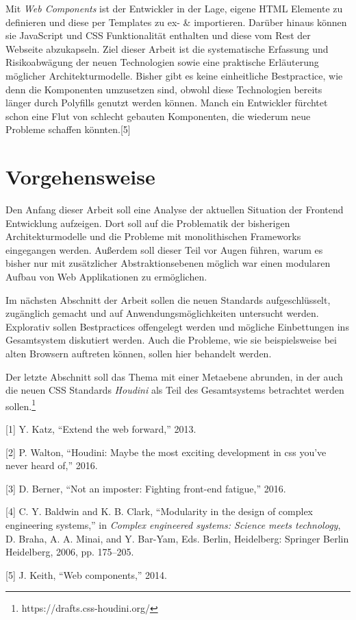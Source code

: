Mit \emph{Web Components} ist der Entwickler in der Lage, eigene HTML
Elemente zu definieren und diese per Templates zu ex- \& importieren.
Darüber hinaus können sie JavaScript und CSS Funktionalität enthalten
und diese vom Rest der Webseite abzukapseln. Ziel dieser Arbeit ist die
systematische Erfassung und Risikoabwägung der neuen Technologien sowie
eine praktische Erläuterung möglicher Architekturmodelle. Bisher gibt es
keine einheitliche Bestpractice, wie denn die Komponenten umzusetzen
sind, obwohl diese Technologien bereits länger durch Polyfills genutzt
werden können. Manch ein Entwickler fürchtet schon eine Flut von
schlecht gebauten Komponenten, die wiederum neue Probleme schaffen
könnten.{[}5{]}

\section{Vorgehensweise}\label{vorgehensweise}

Den Anfang dieser Arbeit soll eine Analyse der aktuellen Situation der
Frontend Entwicklung aufzeigen. Dort soll auf die Problematik der
bisherigen Architekturmodelle und die Probleme mit monolithischen
Frameworks eingegangen werden. Außerdem soll dieser Teil vor Augen
führen, warum es bisher nur mit zusätzlicher Abstraktionsebenen möglich
war einen modularen Aufbau von Web Applikationen zu ermöglichen.

Im nächsten Abschnitt der Arbeit sollen die neuen Standards
aufgeschlüsselt, zugänglich gemacht und auf Anwendungsmöglichkeiten
untersucht werden. Explorativ sollen Bestpractices offengelegt werden
und mögliche Einbettungen ins Gesamtsystem diskutiert werden. Auch die
Probleme, wie sie beispielsweise bei alten Browsern auftreten können,
sollen hier behandelt werden.

Der letzte Abschnitt soll das Thema mit einer Metaebene abrunden, in der
auch die neuen CSS Standards \emph{Houdini} als Teil des Gesamtsystems
betrachtet werden sollen.\footnote{https://drafts.css-houdini.org/}

\hypertarget{refs}{}
\hypertarget{ref-Katz2013}{}
{[}1{]} Y. Katz, ``Extend the web forward,'' 2013.

\hypertarget{ref-Walton2016}{}
{[}2{]} P. Walton, ``Houdini: Maybe the most exciting development in css
you've never heard of,'' 2016.

\hypertarget{ref-Berner2016}{}
{[}3{]} D. Berner, ``Not an imposter: Fighting front-end fatigue,''
2016.

\hypertarget{ref-Baldwin2006}{}
{[}4{]} C. Y. Baldwin and K. B. Clark, ``Modularity in the design of
complex engineering systems,'' in \emph{Complex engineered systems:
Science meets technology}, D. Braha, A. A. Minai, and Y. Bar-Yam, Eds.
Berlin, Heidelberg: Springer Berlin Heidelberg, 2006, pp. 175--205.

\hypertarget{ref-Keith2014}{}
{[}5{]} J. Keith, ``Web components,'' 2014.
